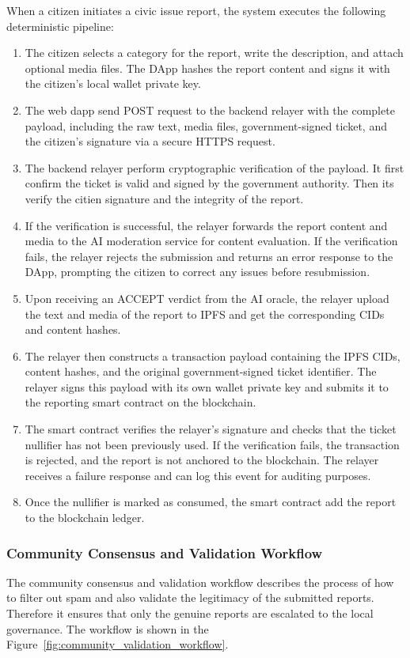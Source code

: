 When a citizen initiates a civic issue report, the system executes the following deterministic pipeline:
\begin{enumerate}
    \item The citizen selects a category for the report, write the description, and attach optional media files. The DApp hashes the report content and signs it with the citizen's local wallet private key.
    \item The web dapp send POST request to the backend relayer with the complete payload, including the raw text, media files, government-signed ticket, and the citizen's signature  via a secure HTTPS request.
    \item The backend relayer perform cryptographic verification of the payload. It first confirm the ticket is valid and signed by the government authority. Then its verify the citien signature and the integrity of the report.
    \item If the verification is successful, the relayer forwards the report content and media to the AI moderation service for content evaluation. If the verification fails, the relayer rejects the submission and returns an error response to the DApp, prompting the citizen to correct any issues before resubmission.   
    \item  Upon receiving an ACCEPT verdict from the AI oracle, the relayer upload the text and media of the report to IPFS and get the corresponding CIDs and content hashes.
    \item The relayer then constructs a transaction payload containing the IPFS CIDs, content hashes, and the original government-signed ticket identifier. The relayer signs this payload with its own wallet private key and submits it to the reporting smart contract on the blockchain.
    \item The smart contract verifies the relayer's signature and checks that the ticket nullifier has not been previously used. If the verification fails, the transaction is rejected, and the report is not anchored to the blockchain. The relayer receives a failure response and can log this event for auditing purposes.
    \item Once the nullifier is marked as consumed, the smart contract add the report to the blockchain ledger.
\end{enumerate}

\subsubsection{Community Consensus and Validation Workflow}
The community consensus and validation workflow describes the process of how to filter out spam and also validate the legitimacy of the submitted reports. Therefore it ensures that only the genuine reports are escalated to the local governance. The workflow is shown in the Figure~\ref{fig:community_validation_workflow}.

